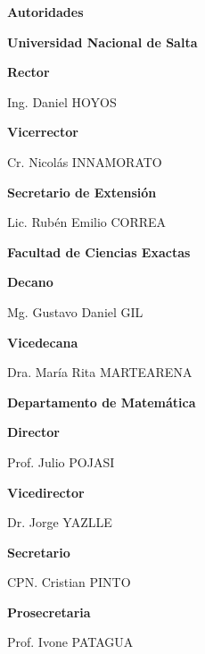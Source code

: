 \begin{center}
	\LARGE \bfseries \sffamily Autoridades
\end{center}

\begin{center}
	\sffamily \Large \bfseries Universidad Nacional de Salta

	\bigskip
	
	\sffamily \large \bfseries Rector
	
	\normalfont \large
	Ing. Daniel HOYOS
	
	\bigskip
	
	\sffamily \large \bfseries Vicerrector
	
	\normalfont \large
	Cr. Nicolás INNAMORATO
	
	\bigskip
	
	\sffamily \large \bfseries Secretario de Extensión 
	
	\normalfont \large
	Lic. Rubén Emilio CORREA
\end{center}

\vspace*{5mm}

\begin{center}
	\sffamily \Large \bfseries Facultad de Ciencias Exactas
	
	\bigskip
	
	\sffamily \large \bfseries Decano
	
	\normalfont \large
	Mg. Gustavo Daniel GIL
	
	\bigskip
	
	\sffamily \large \bfseries Vicedecana
	
	\normalfont \large
	Dra. María Rita MARTEARENA
\end{center}

\vspace*{5mm}

\begin{center}
	\sffamily \Large \bfseries Departamento de Matemática
	
	\bigskip
	
	\sffamily \large \bfseries Director
	
	\normalfont \large
	Prof. Julio POJASI
	
	\bigskip
	
	\sffamily \large \bfseries Vicedirector
	
	\normalfont \large
	Dr. Jorge YAZLLE
	
	\bigskip
	
	\sffamily \large \bfseries Secretario
	
	\normalfont \large
	CPN. Cristian PINTO
	
	\bigskip
	
	\sffamily \large \bfseries Prosecretaria
	
	\normalfont \large
	Prof. Ivone PATAGUA
\end{center}